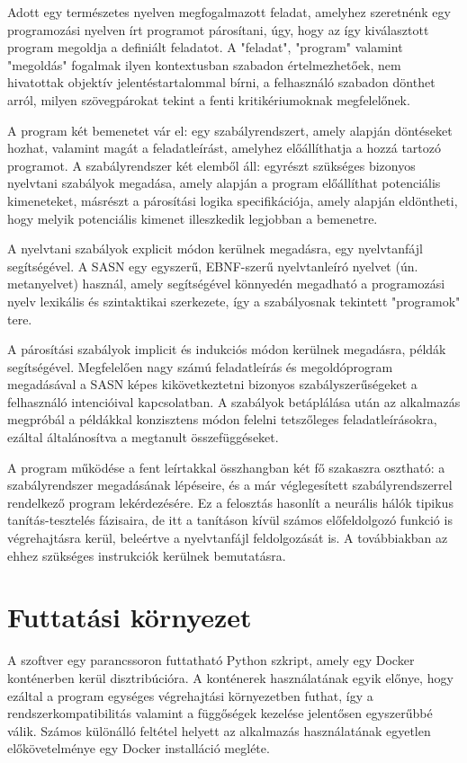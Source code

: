 \documentclass[twoside, 12pt]{report}
\begin{document}
Adott egy természetes nyelven megfogalmazott feladat, amelyhez szeretnénk egy programozási nyelven írt programot párosítani, úgy, hogy az így kiválasztott program megoldja a definiált feladatot. A "feladat", "program" valamint "megoldás" fogalmak ilyen kontextusban szabadon értelmezhetőek, nem hivatottak objektív jelentéstartalommal bírni, a felhasználó szabadon dönthet arról, milyen szövegpárokat tekint a fenti kritikériumoknak megfelelőnek.

A program két bemenetet vár el: egy szabályrendszert, amely alapján döntéseket hozhat, valamint magát a feladatleírást, amelyhez előállíthatja a hozzá tartozó programot. A szabályrendszer két elemből áll: egyrészt szükséges bizonyos nyelvtani szabályok megadása, amely alapján a program előállíthat potenciális kimeneteket, másrészt a párosítási logika specifikációja, amely alapján eldöntheti, hogy melyik potenciális kimenet illeszkedik legjobban a bemenetre.

A nyelvtani szabályok explicit módon kerülnek megadásra, egy nyelvtanfájl segítségével. A SASN egy egyszerű, EBNF-szerű \parencite{Wir77a} nyelvtanleíró nyelvet (ún. metanyelvet) használ, amely segítségével könnyedén megadható a programozási nyelv lexikális és szintaktikai szerkezete, így a szabályosnak tekintett "programok" tere.

A párosítási szabályok implicit és indukciós módon kerülnek megadásra, példák segítségével. Megfelelően nagy számú feladatleírás és megoldóprogram megadásával a SASN képes kikövetkeztetni bizonyos szabályszerűségeket a felhasználó intencióival kapcsolatban. A szabályok betáplálása után az alkalmazás megpróbál a példákkal konzisztens módon felelni tetszőleges feladatleírásokra, ezáltal általánosítva a megtanult összefüggéseket.

A program működése a fent leírtakkal összhangban két fő szakaszra osztható: a szabályrendszer megadásának lépéseire, és a már véglegesített szabályrendszerrel rendelkező program lekérdezésére. Ez a felosztás hasonlít a neurális hálók tipikus tanítás-tesztelés fázisaira, de itt a tanításon kívül számos előfeldolgozó funkció is végrehajtásra kerül, beleértve a nyelvtanfájl feldolgozását is. A továbbiakban az ehhez szükséges instrukciók kerülnek bemutatásra.

\section{Futtatási környezet}

A szoftver egy parancssoron futtatható Python szkript, amely egy Docker\footnotemark{} konténerben kerül disztribúcióra. A konténerek használatának egyik előnye, hogy ezáltal a program egységes végrehajtási környezetben futhat, így a rendszerkompatibilitás valamint a függőségek kezelése jelentősen egyszerűbbé válik. Számos különálló feltétel helyett az alkalmazás használatának egyetlen előkövetelménye egy Docker installáció megléte.
\end{document}
